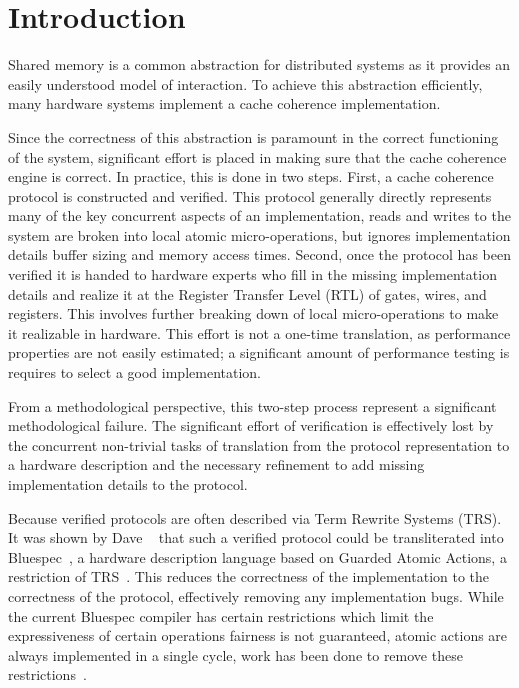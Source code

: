 \section{Introduction}
\label{Sec:Introduction}

Shared memory is a common abstraction for distributed systems as it
provides an easily understood model of interaction. To achieve this
abstraction efficiently, many hardware systems implement a cache
coherence implementation. 

Since the correctness of this abstraction is paramount in the correct
functioning of the system, significant effort is placed in making sure
that the cache coherence engine is correct. In practice, this is done
in two steps. First, a cache coherence protocol is constructed and
verified. This protocol generally directly represents many of
the key concurrent aspects of an implementation, \eg{} reads and
writes to the system are broken into local atomic micro-operations, but
ignores implementation details \eg{} buffer sizing and memory access
times. Second, once the protocol has been verified it is handed to
hardware experts who fill in the missing implementation details and
realize it at the Register Transfer Level (RTL) of gates, wires, and
registers. This involves further breaking down of local micro-operations to
make it realizable in hardware. This effort is not a one-time translation, as
performance properties are not easily estimated; a significant amount of
performance testing is requires to select a good implementation. 

From a methodological perspective, this two-step process represent a
significant methodological failure. The significant effort of
verification is effectively lost by the concurrent non-trivial tasks
of translation from the protocol representation to a hardware
description and the necessary refinement to add missing implementation
details to the protocol. 

Because verified protocols are often described via Term Rewrite
Systems (TRS). It was shown by Dave
\etal{}~\cite{DNA:CoherenceImplementation} that such a verified
protocol could be transliterated into Bluespec~\cite{Bluespec:TFRG}, a
hardware description language based on Guarded Atomic Actions, a
restriction of TRS~\cite{Hoe:TCAD}. This reduces the correctness of
the implementation to the correctness of the protocol, effectively
removing any implementation bugs. While the current Bluespec compiler
has certain restrictions which limit the expressiveness of certain
operations \eg{} fairness is not guaranteed, atomic actions are always
implemented in a single cycle, work has been done to remove these
restrictions~\cite{DNA:CoherenceImplementation, Karczmarek}.

